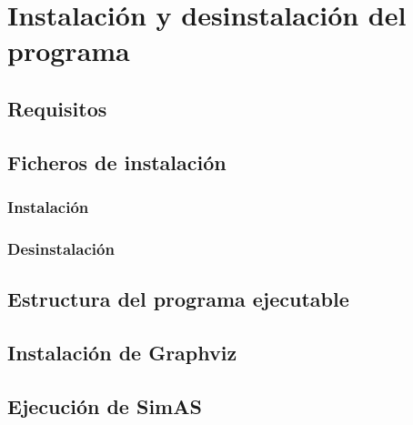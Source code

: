 \chapter{Instalación y desinstalación del programa}

\section{Requisitos}




\section{Ficheros de instalación}


\subsection{Instalación}


\subsection{Desinstalación}

\section{Estructura del programa ejecutable}

\section{Instalación de Graphviz}


\section{Ejecución de SimAS}
